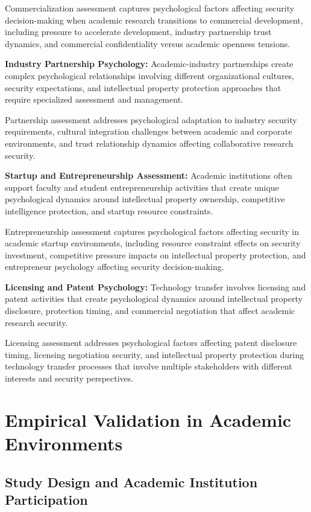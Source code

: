 \documentclass[10pt, twocolumn]{article}
\begin{document}
Commercialization assessment captures psychological factors affecting security decision-making when academic research transitions to commercial development, including pressure to accelerate development, industry partnership trust dynamics, and commercial confidentiality versus academic openness tensions.

\textbf{Industry Partnership Psychology:} Academic-industry partnerships create complex psychological relationships involving different organizational cultures, security expectations, and intellectual property protection approaches that require specialized assessment and management.

Partnership assessment addresses psychological adaptation to industry security requirements, cultural integration challenges between academic and corporate environments, and trust relationship dynamics affecting collaborative research security.

\textbf{Startup and Entrepreneurship Assessment:} Academic institutions often support faculty and student entrepreneurship activities that create unique psychological dynamics around intellectual property ownership, competitive intelligence protection, and startup resource constraints.

Entrepreneurship assessment captures psychological factors affecting security in academic startup environments, including resource constraint effects on security investment, competitive pressure impacts on intellectual property protection, and entrepreneur psychology affecting security decision-making.

\textbf{Licensing and Patent Psychology:} Technology transfer involves licensing and patent activities that create psychological dynamics around intellectual property disclosure, protection timing, and commercial negotiation that affect academic research security.

Licensing assessment addresses psychological factors affecting patent disclosure timing, licensing negotiation security, and intellectual property protection during technology transfer processes that involve multiple stakeholders with different interests and security perspectives.

\section{Empirical Validation in Academic Environments}

\subsection{Study Design and Academic Institution Participation}
\end{document}
